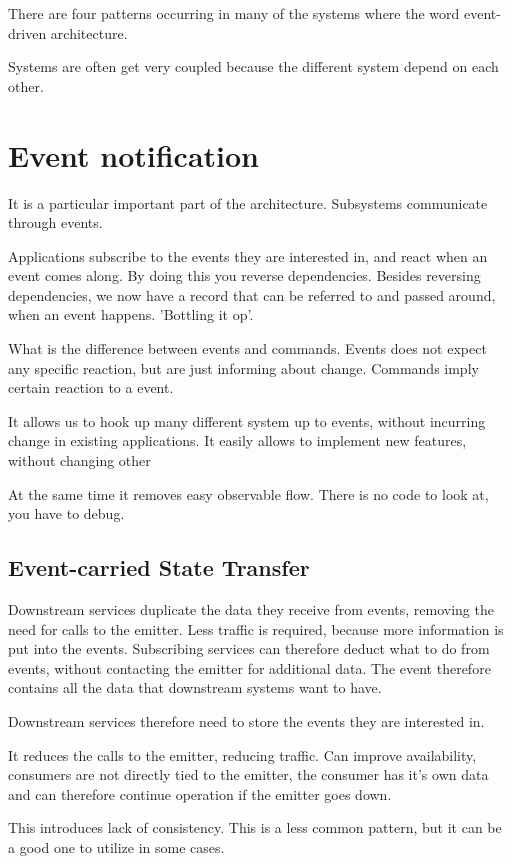 There are four patterns occurring in many of the systems where the word event-driven architecture.

Systems are often get very coupled because the different system depend on each other.

\section{Event notification}
It is a particular important part of the architecture. Subsystems communicate through events.

Applications subscribe to the events they are interested in, and react when an event comes along. 
By doing this you reverse dependencies.
Besides reversing dependencies, we now have a record that can be referred to and passed around, when an event happens. 'Bottling it op'.

What is the difference between events and commands. Events does not expect any specific reaction, but are just informing about change. Commands imply certain reaction to a event.

It allows us to hook up many different system up to events, without incurring change in existing applications. It easily allows to implement new features, without changing other

At the same time it removes easy observable flow. There is no code to look at, you have to debug.

\subsection{Event-carried State Transfer}
Downstream services duplicate the data they receive from events, removing the need for calls to the emitter. Less traffic is required, because more information is put into the events. Subscribing services can therefore deduct what to do from events, without contacting the emitter for additional data. The event therefore contains all the data that downstream systems want to have.

Downstream services therefore need to store the events they are interested in. 

It reduces the calls to the emitter, reducing traffic. Can improve availability, consumers are not directly tied to the emitter, the consumer has it's own data and can therefore continue operation if the emitter goes down.

This introduces lack of consistency. This is a less common pattern, but it can be a good one to utilize in some cases.


